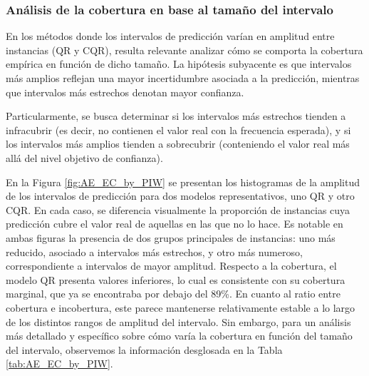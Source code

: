 \FloatBarrier

\subsubsection{Análisis de la cobertura en base al tamaño del intervalo}

En los métodos donde los intervalos de predicción varían en amplitud entre instancias (QR y CQR), resulta relevante analizar cómo se comporta la cobertura empírica en función de dicho tamaño. La hipótesis subyacente es que intervalos más amplios reflejan una mayor incertidumbre asociada a la predicción, mientras que intervalos más estrechos denotan mayor confianza.

Particularmente, se busca determinar si los intervalos más estrechos tienden a infracubrir (es decir, no contienen el valor real con la frecuencia esperada), y si los intervalos más amplios tienden a sobrecubrir (conteniendo el valor real más allá del nivel objetivo de confianza).

En la Figura \ref{fig:AE_EC_by_PIW} se presentan los histogramas de la amplitud de los intervalos de predicción para dos modelos representativos, uno QR y otro CQR. En cada caso, se diferencia visualmente la proporción de instancias cuya predicción cubre el valor real de aquellas en las que no lo hace. Es notable en ambas figuras la presencia de dos grupos principales de instancias: uno más reducido, asociado a intervalos más estrechos, y otro más numeroso, correspondiente a intervalos de mayor amplitud. Respecto a la cobertura, el modelo QR presenta valores inferiores, lo cual es consistente con su cobertura marginal, que ya se encontraba por debajo del 89\%. En cuanto al ratio entre cobertura e incobertura, este parece mantenerse relativamente estable a lo largo de los distintos rangos de amplitud del intervalo. Sin embargo, para un análisis más detallado y específico sobre cómo varía la cobertura en función del tamaño del intervalo, observemos la información desglosada en la Tabla \ref{tab:AE_EC_by_PIW}.


